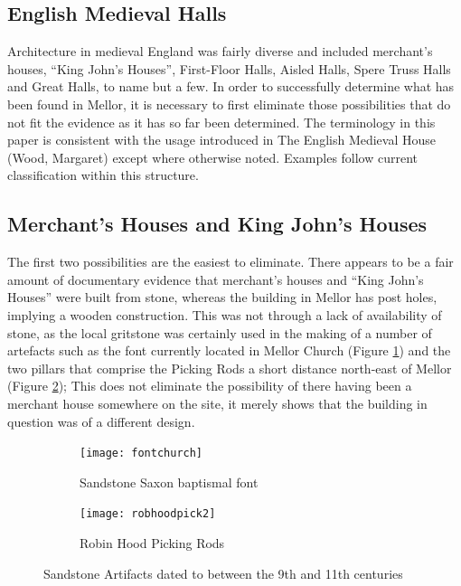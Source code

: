 \documentclass[letterpaper,11pt,titlepage]{article}
\begin{document}
{\subsection{English Medieval Halls}
Architecture in medieval England was fairly diverse and included merchant's houses, ``King John's Houses'', First-Floor Halls, Aisled Halls, Spere Truss Halls and Great Halls, to name but a few. In order to successfully determine what has been found in Mellor, it is necessary to first eliminate those possibilities that do not fit the evidence as it has so far been determined. The terminology in this paper is consistent with the usage introduced in The English Medieval House (Wood, Margaret) except where otherwise noted. Examples follow current classification within this structure.

\subsection{Merchant's Houses and King John's Houses}
The first two possibilities are the easiest to eliminate. There appears to be a fair amount of documentary evidence that merchant's houses and ``King John's Houses'' were built from stone, whereas the building in Mellor has post holes, implying a wooden construction. This was not through a lack of availability of stone, as the local gritstone was certainly used in the making of a number of artefacts such as the font currently located in Mellor Church (Figure \ref{fig:baptismfont}) and the two pillars that comprise the Picking Rods a short distance north-east of Mellor (Figure \ref{fig:pickingrods}); This does not eliminate the possibility of there having been a merchant house somewhere on the site, it merely shows that the building in question was of a different design.

\begin{figure}
	\centering
	\begin{subfigure}[b]{0.3\textwidth}
		\texttt{[image: fontchurch]}
		\caption{Sandstone Saxon baptismal font}
		\label{fig:baptismfont}
	\end{subfigure}
	\begin{subfigure}[b]{0.3\textwidth}
		\texttt{[image: robhoodpick2]}
		\caption{Robin Hood Picking Rods}
		\label{fig:pickingrods}
	\end{subfigure}
	\caption{Sandstone Artifacts dated to between the 9th and 11th centuries}\label{fig:saxons}
\end{figure}

}
\end{document}
